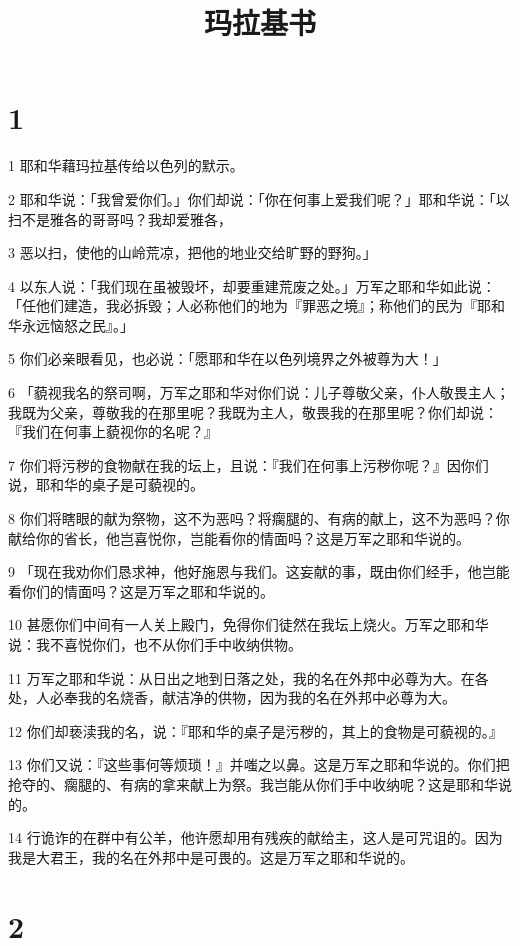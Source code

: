 

\title{玛拉基书}


\chapter{1}

\par 1 耶和华藉玛拉基传给以色列的默示。
\par 2 耶和华说：「我曾爱你们。」你们却说：「你在何事上爱我们呢？」耶和华说：「以扫不是雅各的哥哥吗？我却爱雅各，
\par 3 恶以扫，使他的山岭荒凉，把他的地业交给旷野的野狗。」
\par 4 以东人说：「我们现在虽被毁坏，却要重建荒废之处。」万军之耶和华如此说：「任他们建造，我必拆毁；人必称他们的地为『罪恶之境』；称他们的民为『耶和华永远恼怒之民』。」
\par 5 你们必亲眼看见，也必说：「愿耶和华在以色列境界之外被尊为大！」
\par 6 「藐视我名的祭司啊，万军之耶和华对你们说：儿子尊敬父亲，仆人敬畏主人；我既为父亲，尊敬我的在那里呢？我既为主人，敬畏我的在那里呢？你们却说：『我们在何事上藐视你的名呢？』
\par 7 你们将污秽的食物献在我的坛上，且说：『我们在何事上污秽你呢？』因你们说，耶和华的桌子是可藐视的。
\par 8 你们将瞎眼的献为祭物，这不为恶吗？将瘸腿的、有病的献上，这不为恶吗？你献给你的省长，他岂喜悦你，岂能看你的情面吗？这是万军之耶和华说的。
\par 9 「现在我劝你们恳求神，他好施恩与我们。这妄献的事，既由你们经手，他岂能看你们的情面吗？这是万军之耶和华说的。
\par 10 甚愿你们中间有一人关上殿门，免得你们徒然在我坛上烧火。万军之耶和华说：我不喜悦你们，也不从你们手中收纳供物。
\par 11 万军之耶和华说：从日出之地到日落之处，我的名在外邦中必尊为大。在各处，人必奉我的名烧香，献洁净的供物，因为我的名在外邦中必尊为大。
\par 12 你们却亵渎我的名，说：『耶和华的桌子是污秽的，其上的食物是可藐视的。』
\par 13 你们又说：『这些事何等烦琐！』并嗤之以鼻。这是万军之耶和华说的。你们把抢夺的、瘸腿的、有病的拿来献上为祭。我岂能从你们手中收纳呢？这是耶和华说的。
\par 14 行诡诈的在群中有公羊，他许愿却用有残疾的献给主，这人是可咒诅的。因为我是大君王，我的名在外邦中是可畏的。这是万军之耶和华说的。

\chapter{2}

